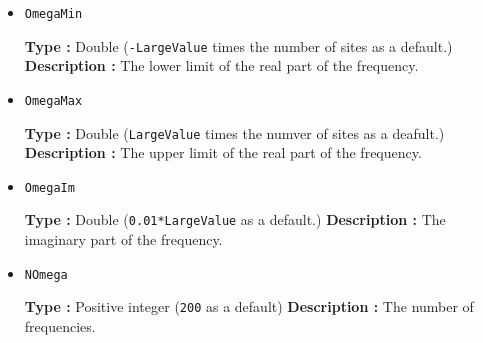 \begin{itemize}
\item \verb|OmegaMin|

    {\bf Type :} Double (\verb|-LargeValue| times the number of sites as a default.)
    {\bf Description :} The lower limit of the real part of the frequency.
    
  \item \verb|OmegaMax|

    {\bf Type :} Double (\verb|LargeValue| times the numver of sites as a deafult.)
    {\bf Description :} The upper limit of the real part of the frequency.

  \item \verb|OmegaIm|

    {\bf Type :} Double (\verb|0.01*LargeValue| as a default.)
    {\bf Description :} The imaginary part of the frequency.

  \item \verb|NOmega|
  
    {\bf Type :} Positive integer (\verb|200| as a default)
    {\bf Description :} The number of frequencies.

\end{itemize}

